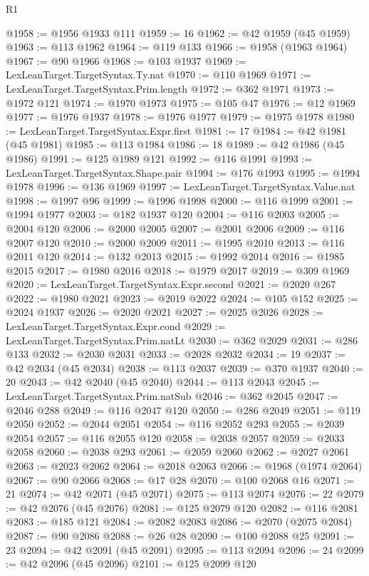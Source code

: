 \begin{lexlean}{R1}
\begin{coremodule}
@1958 := @1956 @1933 @111
@1959 := 16
@1962 := @42 @1959 (@45 @1959)
@1963 := @113 @1962
@1964 := @119 @133
@1966 := @1958 (@1963 @1964)
@1967 := @90 @1966
@1968 := @103 @1937
@1969 := LexLeanTarget.TargetSyntax.Ty.nat
@1970 := @110 @1969
@1971 := LexLeanTarget.TargetSyntax.Prim.length
@1972 := @362 @1971
@1973 := @1972 @121
@1974 := @1970 @1973
@1975 := @105 @47
@1976 := @12 @1969
@1977 := @1976 @1937
@1978 := @1976 @1977
@1979 := @1975 @1978
@1980 := LexLeanTarget.TargetSyntax.Expr.first
@1981 := 17
@1984 := @42 @1981 (@45 @1981)
@1985 := @113 @1984
@1986 := 18
@1989 := @42 @1986 (@45 @1986)
@1991 := @125 @1989 @121
@1992 := @116 @1991
@1993 := LexLeanTarget.TargetSyntax.Shape.pair
@1994 := @176 @1993
@1995 := @1994 @1978
@1996 := @136 @1969
@1997 := LexLeanTarget.TargetSyntax.Value.nat
@1998 := @1997 @96
@1999 := @1996 @1998
@2000 := @116 @1999
@2001 := @1994 @1977
@2003 := @182 @1937 @120
@2004 := @116 @2003
@2005 := @2004 @120
@2006 := @2000 @2005
@2007 := @2001 @2006
@2009 := @116 @2007 @120
@2010 := @2000 @2009
@2011 := @1995 @2010
@2013 := @116 @2011 @120
@2014 := @132 @2013
@2015 := @1992 @2014
@2016 := @1985 @2015
@2017 := @1980 @2016
@2018 := @1979 @2017
@2019 := @309 @1969
@2020 := LexLeanTarget.TargetSyntax.Expr.second
@2021 := @2020 @267
@2022 := @1980 @2021
@2023 := @2019 @2022
@2024 := @105 @152
@2025 := @2024 @1937
@2026 := @2020 @2021
@2027 := @2025 @2026
@2028 := LexLeanTarget.TargetSyntax.Expr.cond
@2029 := LexLeanTarget.TargetSyntax.Prim.natLt
@2030 := @362 @2029
@2031 := @286 @133
@2032 := @2030 @2031
@2033 := @2028 @2032
@2034 := 19
@2037 := @42 @2034 (@45 @2034)
@2038 := @113 @2037
@2039 := @370 @1937
@2040 := 20
@2043 := @42 @2040 (@45 @2040)
@2044 := @113 @2043
@2045 := LexLeanTarget.TargetSyntax.Prim.natSub
@2046 := @362 @2045
@2047 := @2046 @288
@2049 := @116 @2047 @120
@2050 := @286 @2049
@2051 := @119 @2050
@2052 := @2044 @2051
@2054 := @116 @2052 @293
@2055 := @2039 @2054
@2057 := @116 @2055 @120
@2058 := @2038 @2057
@2059 := @2033 @2058
@2060 := @2038 @293
@2061 := @2059 @2060
@2062 := @2027 @2061
@2063 := @2023 @2062
@2064 := @2018 @2063
@2066 := @1968 (@1974 @2064)
@2067 := @90 @2066
@2068 := @17 @28
@2070 := @100 @2068 @16
@2071 := 21
@2074 := @42 @2071 (@45 @2071)
@2075 := @113 @2074
@2076 := 22
@2079 := @42 @2076 (@45 @2076)
@2081 := @125 @2079 @120
@2082 := @116 @2081
@2083 := @185 @121
@2084 := @2082 @2083
@2086 := @2070 (@2075 @2084)
@2087 := @90 @2086
@2088 := @26 @28
@2090 := @100 @2088 @25
@2091 := 23
@2094 := @42 @2091 (@45 @2091)
@2095 := @113 @2094
@2096 := 24
@2099 := @42 @2096 (@45 @2096)
@2101 := @125 @2099 @120

\end{coremodule}
\end{lexlean}
